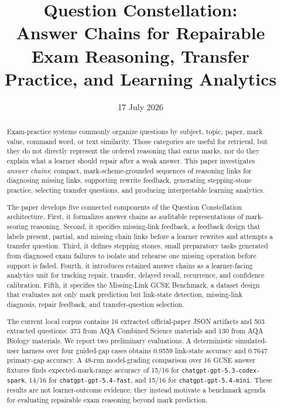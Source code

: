 \documentclass[11pt]{article}
\title{\textbf{Question Constellation:\\Answer Chains for Repairable Exam Reasoning, Transfer Practice, and Learning Analytics}}
\author{\affiliationblock}
\date{17 July 2026}
\begin{document}
\maketitle

\begin{abstract}
Exam-practice systems commonly organize questions by subject, topic, paper, mark value, command word, or text similarity. Those categories are useful for retrieval, but they do not directly represent the ordered reasoning that earns marks, nor do they explain what a learner should repair after a weak answer. This paper investigates \textit{answer chains}: compact, mark-scheme-grounded sequences of reasoning links for diagnosing missing links, supporting rewrite feedback, generating stepping-stone practice, selecting transfer questions, and producing interpretable learning analytics.

The paper develops five connected components of the Question Constellation architecture. First, it formalizes answer chains as auditable representations of mark-scoring reasoning. Second, it specifies missing-link feedback, a feedback design that labels present, partial, and missing chain links before a learner rewrites and attempts a transfer question. Third, it defines stepping stones, small preparatory tasks generated from diagnosed exam failures to isolate and rehearse one missing operation before support is faded. Fourth, it introduces retained answer chains as a learner-facing analytics unit for tracking repair, transfer, delayed recall, recurrence, and confidence calibration. Fifth, it specifies the Missing-Link GCSE Benchmark, a dataset design that evaluates not only mark prediction but link-state detection, missing-link diagnosis, repair feedback, and transfer-question selection.

The current local corpus contains 16 extracted official-paper JSON artifacts and 503 extracted questions: 373 from AQA Combined Science materials and 130 from AQA Biology materials. We report two preliminary evaluations. A deterministic simulated-user harness over four guided-gap cases obtains 0.9559 link-state accuracy and 0.7647 primary-gap accuracy. A 48-run model-grading comparison over 16 GCSE answer fixtures finds expected-mark-range accuracy of 15/16 for \texttt{chatgpt-gpt-5.3-codex-spark}, 14/16 for \texttt{chatgpt-gpt-5.4-fast}, and 15/16 for \texttt{chatgpt-gpt-5.4-mini}. These results are not learner-outcome evidence; they instead motivate a benchmark agenda for evaluating repairable exam reasoning beyond mark prediction.
\end{abstract}
\end{document}
